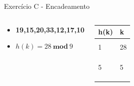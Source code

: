 \documentclass{beamer}
\begin{document}
\begin{frame}{Exercício C - Encadeamento}
\begin{columns}
        \footnotesize         
        \begin{block}{}
 		 \begin{itemize}
 		  \item \textbf{19,15,20,33,12,17,10}
 		  \item $h(k) = 28 \ \mathbf{mod} \ 9$  
 		 \end{itemize}

 		  \end{block} 
    
        \begin{table}[]
        \centering
        \footnotesize
        \begin{tabular}{|l|l|}
        \hline
        h(k) & k \\ \hline
            &   \\ \hline
        1   & 28  \\ \hline
            &   \\ \hline
            &   \\ \hline
            &   \\ \hline
        5   & 5   \\ \hline
            &   \\ \hline
            &   \\ \hline
            &   \\ \hline
        \end{tabular}%

        \end{table}       
        \end{columns}
\end{frame}
\end{document}

